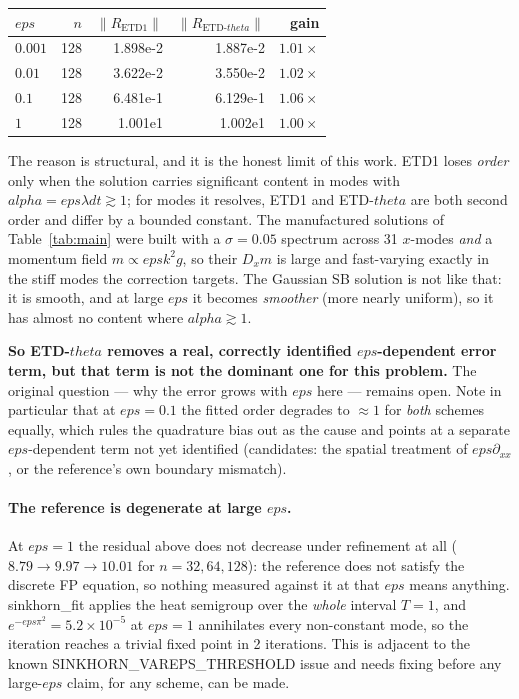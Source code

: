 \documentclass[11pt]{article}
\newcommand{\eps}{\varepsilon}
\newcommand{\dt}{\Delta t}
\newcommand{\dx}{\Delta x}
\newcommand{\code}[1]{\texttt{#1}}
\def\theta{theta}\def\Theta{Theta}\def\alpha{alpha}\def\rho{rho}%
\def\eps{eps}\def\dt{dt}\def\dx{dx}\def\code#1{#1}%
\begin{document}
\begin{center}
\begin{tabular}{@{}lrrrr@{}}
\toprule
$\eps$ & $n$ & $\|R_{\mathrm{ETD1}}\|$ & $\|R_{\mathrm{ETD}\text{-}\theta}\|$ & gain \\
\midrule
$0.001$ & 128 & 1.898e-2 & 1.887e-2 & $1.01\times$ \\
$0.01$  & 128 & 3.622e-2 & 3.550e-2 & $1.02\times$ \\
$0.1$   & 128 & 6.481e-1 & 6.129e-1 & $1.06\times$ \\
$1$     & 128 & 1.001e1  & 1.002e1  & $1.00\times$ \\
\bottomrule
\end{tabular}
\end{center}

The reason is structural, and it is the honest limit of this work.
ETD1 loses \emph{order} only when the solution carries significant content in
modes with $\alpha=\eps\lambda\dt\gtrsim1$; for modes it resolves, ETD1 and
ETD-$\theta$ are both second order and differ by a bounded constant. The
manufactured solutions of Table~\ref{tab:main} were built with a
$\sigma=0.05$ spectrum across 31 $x$-modes \emph{and} a momentum field
$m\propto\eps k^2g$, so their $D_xm$ is large and fast-varying exactly in the
stiff modes the correction targets. The Gaussian SB solution is not like
that: it is smooth, and at large $\eps$ it becomes \emph{smoother} (more
nearly uniform), so it has almost no content where $\alpha\gtrsim1$.

\textbf{So ETD-$\theta$ removes a real, correctly identified $\eps$-dependent
error term, but that term is not the dominant one for this problem.} The
original question --- why the error grows with $\eps$ here --- remains open.
Note in particular that at $\eps=0.1$ the fitted order degrades to $\approx1$
for \emph{both} schemes equally, which rules the quadrature bias out as the
cause and points at a separate $\eps$-dependent term not yet identified
(candidates: the spatial treatment of $\eps\partial_{xx}$, or the reference's
own boundary mismatch).

\paragraph{The reference is degenerate at large $\eps$.} At $\eps=1$ the
residual above does not decrease under refinement at all ($8.79\to9.97\to
10.01$ for $n=32,64,128$): the reference does not satisfy the discrete FP
equation, so nothing measured against it at that $\eps$ means anything.
\code{sinkhorn\_fit} applies the heat semigroup over the \emph{whole}
interval $T=1$, and $e^{-\eps\pi^2}=5.2\times10^{-5}$ at $\eps=1$ annihilates
every non-constant mode, so the iteration reaches a trivial fixed point in 2
iterations. This is adjacent to the known
\code{SINKHORN\_VAREPS\_THRESHOLD} issue and needs fixing before any
large-$\eps$ claim, for any scheme, can be made.
\end{document}
